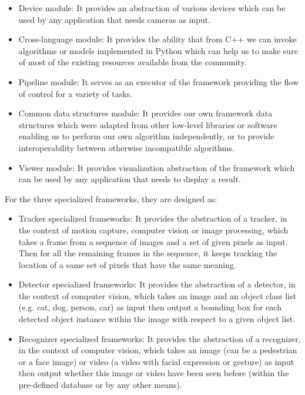 \begin{itemize}
    \item Device module: It provides an abstraction of various devices which
    can be used by any application that needs cameras as input.

    \item Cross-language module: It provides the ability that from C++ we can
    invoke algorithms or models implemented in Python which can help us to make
    sure of most of the existing resources available from the community.

    \item Pipeline module: It serves as an executor of the framework providing
    the flow of control for a variety of tasks.

    \item Common data structures module: It provides our own framework data structures
    which were adapted from other low-level libraries or software enabling us
    to perform our own algorithm independently, or to provide interoperability between 
    otherwise incompatible algorithms.

    \item Viewer module: It provides visualization abstraction of the framework
    which can be used by any application that needs to display a result.
\end{itemize}

For the three specialized frameworks, they are designed as:

\begin{itemize}
    \item Tracker specialized frameworks: It provides the abstraction of a 
    tracker, in the context of motion capture, computer vision or image 
    processing, which takes a frame from a sequence of images and a set of 
    given pixels as input. Then for all the remaining frames in the sequence, 
    it keeps tracking the location of a same set of pixels that have the same 
    meaning.

    \item Detector specialized frameworks: It provides the abstraction of a
    detector, in the context of computer vision, which takes an image and an
    object class list (e.g. cat, dog, person, car) as input then output a
    bounding box for each detected object instance within the image with respect to 
    a given object list.

    \item Recognizer specialized frameworks: It provides the abstraction of a
    recognizer, in the context of computer vision, which takes an image (can be
    a pedestrian or a face image) or video (a video with facial expression or
    gesture) as input then output whether this image or video have been seen
    before (within the pre-defined database or by any other means).
\end{itemize}

